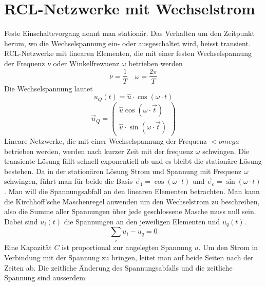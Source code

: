 \section{RCL-Netzwerke mit Wechselstrom}
Feste Einschaltevorgang nennt man stationär. Das Verhalten um den Zeitpunkt herum, wo die Wechselspannung ein- oder ausgeschaltet wird, heisst transient.
\newline\newline
RCL-Netzwerke mit linearen Elementen, die mit einer festen Wechselspannung der Frequenz $\nu$ oder Winkelfrewuenz $\omega$ betrieben werden
\begin{equation}
\boxed{\nu=\dfrac{1}{T}}\quad \boxed{\omega=\dfrac{2\pi}{T}}
\end{equation}
Die Wechselspannung lautet
\begin{equation}
\boxed{u_Q\left(t\right)=\hat{u}\cdot\cos\left(\omega\cdot t\right)}
\end{equation}
\begin{equation}
\boxed{\overrightarrow{u}_Q=\begin{pmatrix}\hat{u}\cos\left(\omega\cdot \overrightarrow{t}\right)\\\hat{u}\cdot \sin\left(\omega\cdot \overrightarrow{t}\right)\end{pmatrix}}
\end{equation}
Lineare Netzwerke, die mit einer Wechselspannung der Frequenz $<omega$ betrieben werden, werden nach kurzer Zeit mit der frequenz $\omega$ schwingen. Die transiente Lösung fällt schnell exponentiell ab und es bleibt die stationäre Lösung bestehen. Da in der stationären Lösung Strom und Spannung mit Frequenz $\omega$ schwingen, führt man für beide die Basis $\overrightarrow{e}_1=\cos\left(\omega\cdot t\right)$ und $\overrightarrow{e}_e=\sin\left(\omega\cdot t\right)$.
\newline\newline
Man will die Spannungsabfall an den linearen Elementen betrachten. Man kann die Kirchhoff'sche Maschenregel anwenden um den Wechselstrom zu beschreiben, also die Summe aller Spannungen über jede geschlossene Masche muss null sein. Dabei sind $u_i\left(t\right)$ die Spannungen an den jeweiligen Elementen und $u_q\left(t\right)$.
\begin{equation}
\boxed{\displaystyle \sum_iu_i-u_q=0}
\end{equation}
Eine Kapazität $C$ ist proportional zur angelegten Spannung $u$. Um den Strom in Verbindung mit der Spannung zu bringen, leitet man auf beide Seiten nach der Zeiten ab. Die zeitliche Änderung des Spannungsabfalls und die zeitliche Spannung sind ausserdem
